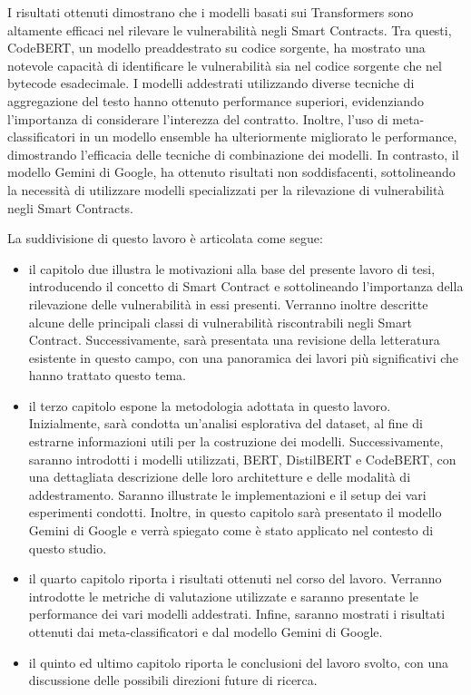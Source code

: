 \documentclass[../../Thesis.tex]{subfiles}
\begin{document}
I risultati ottenuti dimostrano che i modelli basati sui Transformers sono altamente efficaci nel rilevare le vulnerabilit\`a negli Smart Contracts. Tra questi, CodeBERT, un modello preaddestrato su codice sorgente, ha mostrato una notevole capacit\`a di identificare le vulnerabilit\`a sia nel codice sorgente che nel bytecode esadecimale. I modelli addestrati utilizzando diverse tecniche di aggregazione del testo hanno ottenuto performance superiori, evidenziando l'importanza di considerare l'interezza del contratto. Inoltre, l'uso di meta-classificatori in un modello ensemble ha ulteriormente migliorato le performance, dimostrando l'efficacia delle tecniche di combinazione dei modelli. In contrasto, il modello Gemini di Google, ha ottenuto risultati non soddisfacenti, sottolineando la necessit\`a di utilizzare modelli specializzati per la rilevazione di vulnerabilit\`a negli Smart Contracts.

La suddivisione di questo lavoro \`e articolata come segue:
\begin{itemize}
    \item il capitolo due illustra le motivazioni alla base del presente lavoro di tesi, introducendo il concetto di Smart Contract e sottolineando l'importanza della rilevazione delle vulnerabilit\`a in essi presenti. Verranno inoltre descritte alcune delle principali classi di vulnerabilit\`a riscontrabili negli Smart Contract. Successivamente, sar\`a presentata una revisione della letteratura esistente in questo campo, con una panoramica dei lavori pi\`u significativi che hanno trattato questo tema.
    \item il terzo capitolo espone la metodologia adottata in questo lavoro. Inizialmente, sar\`a condotta un'analisi esplorativa del dataset, al fine di estrarne informazioni utili per la costruzione dei modelli.  
    Successivamente, saranno introdotti i modelli utilizzati, BERT, DistilBERT e CodeBERT, con una dettagliata descrizione delle loro architetture e delle modalit\`a di addestramento. Saranno illustrate le implementazioni e il setup dei vari esperimenti condotti. Inoltre, in questo capitolo sar\`a presentato il modello Gemini di Google e verr\`a spiegato come \`e stato applicato nel contesto di questo studio.
    \item il quarto capitolo riporta i risultati ottenuti nel corso del lavoro. Verranno introdotte le metriche di valutazione utilizzate e saranno presentate le performance dei vari modelli addestrati. Infine, saranno mostrati i risultati ottenuti dai meta-classificatori e dal modello Gemini di Google.
    \item il quinto ed ultimo capitolo riporta le conclusioni del lavoro svolto, con una discussione  delle possibili direzioni future di ricerca.     
\end{itemize}
\end{document}
